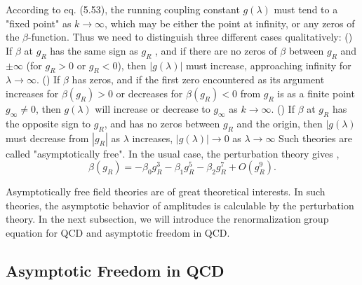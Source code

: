 According to eq. (5.53), the running coupling constant $g(\lambda)$ must tend to a "fixed point" as $k\to\infty$, which may be either the point at infinity, or any zeros of the $\beta$-function. Thus we need to distinguish three different cases qualitatively:
() If $\beta$ at $g_R$ has the same sign as $g_R$
, and if there are no zeros of $\beta$ between $g_R$ and $\pm\infty$ (for $g_R>0$ or $g_R<0$), then $|g(\lambda)|$ must increase, approaching infinity for $\lambda\to\infty$. () If $\beta$ has zeros, and if the first zero encountered as its argument increases for $\beta(g_R)>0$ or decreases for $\beta(g_R)<0$ from $g_R$ is as a finite point $g_\infty\neq0$, then $g(\lambda)$ will increase or decrease to $g_\infty$ as $k\to\infty$. () If $\beta$ at $g_R$ has the opposite sign to $g_R$, and has no zeros between $g_R$ and the origin, then $|g(\lambda)$ must decrease from $|g_R|$ as $\lambda$ increases, $|g(\lambda)|\to0$ as $\lambda\to\infty$ Such theories are called "asymptotically free". In the usual case, the perturbation theory gives \cite{Pol,Pol1,GrossWil,GrossWil1},
\begin{equation}
\beta(g_R)=-\beta_0g_R^3-\beta_1g^5_R-\beta_2g^7_R+O(g^9_R).
\end{equation}



Asymptotically free field theories are of great theoretical interests. In such theories, the asymptotic behavior of amplitudes is calculable by the perturbation theory. In the next subsection, we will introduce the renormalization group equation for QCD and asymptotic freedom in QCD.


\subsection{Asymptotic Freedom in QCD}

